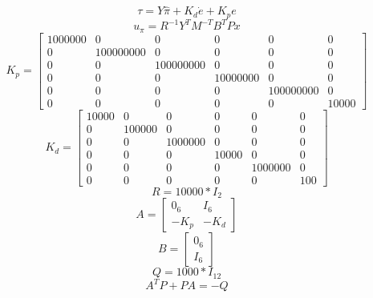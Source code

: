\documentclass[a4paper]{article}
\begin{document}
\begin{equation}
\tau = Y \hat{\pi} + K_d\dot{e} + K_p e
\end{equation}
\begin{equation}
u_{\pi} = R^{-1} Y^T M^{-T} B^T P x
\end{equation}
\begin{equation}
K_p = 
\begin{bmatrix}
1000000 & 0 & 0	& 0 & 0 & 0 \\
0 & 100000000 & 0 & 0 & 0 & 0 \\
0 & 0 & 100000000 & 0 & 0 & 0 \\
0 & 0 & 0 & 10000000 & 0 & 0 \\
0 & 0 & 0 & 0 & 100000000 & 0 \\
0 & 0 & 0 & 0 & 0 & 10000
\end{bmatrix}
\end{equation}
\begin{equation}
K_d = 
\begin{bmatrix}
10000 & 0 & 0	& 0 & 0 & 0 \\
0 & 100000 & 0 & 0 & 0 & 0 \\
0 & 0 & 1000000 & 0 & 0 & 0 \\
0 & 0 & 0 & 10000 & 0 & 0 \\
0 & 0 & 0 & 0 & 1000000 & 0 \\
0 & 0 & 0 & 0 & 0 & 100
\end{bmatrix}
\end{equation}
\begin{equation}
R = 10000 * I_{2}
\end{equation}
\begin{equation}
A = 
\begin{bmatrix}
0_{6} & I_{6} \\
-K_p & -K_d 
\end{bmatrix}
\end{equation}
\begin{equation}
B = 
\begin{bmatrix}
0_{6} \\
I_{6}
\end{bmatrix}
\end{equation}
\begin{equation}
Q = 1000 * I_{12}
\end{equation}
\begin{equation}
A^T P + P A = -Q
\end{equation}
\end{document}
